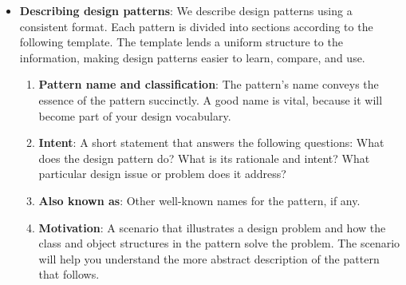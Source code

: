 \documentclass{report}
\begin{document}
\begin{itemize}
            \bigbreak \noindent 
            MVC also lets you change the way a view responds to user input without changing its visual presentation. You might want to change the way it responds to the keyboard, for example, or have it use a pop-up menu instead of command keys. MVC encapsulates the response mechanism in a Controller object. There is a class hierarchy of controllers, making it easy to create a new controller as a variation on an existing one.
            \bigbreak \noindent 
            A view uses an instance of a Controller subclass to implement a particular response strategy; to implement a different strategy, simply replace the instance with a different kind of controller. It's even possible to change a view's controller at run-time to let the view change the way it responds to user input. For example, a view can be disabled so that it doesn't accept input simply by giving it a controller that ignores input events.
            \bigbreak \noindent 
            The main relationships in MVC are given by the Observer, Composite, and Strategy design patterns. MVC uses other design patterns, such as Factory Method (121) to specify the default controller class for a view and Decorator (196) to add scrolling to a view.
        \item \textbf{Describing design patterns}: We describe design patterns using a consistent format. Each pattern is divided into sections according to the following template. The template lends a uniform structure to the information, making design patterns easier to learn, compare, and use.
            \begin{enumerate}
                \item \textbf{Pattern name and classification}: The pattern's name conveys the essence of the pattern succinctly. A good name is vital, because it will become part of your design vocabulary. 
                \item \textbf{Intent}: A short statement that answers the following questions: What does the design pattern do? What is its rationale and intent? What particular design issue or problem does it address? 
                \item \textbf{Also known as}: Other well-known names for the pattern, if any. 
                \item \textbf{Motivation}: A scenario that illustrates a design problem and how the class and object structures in the pattern solve the problem. The scenario will help you understand the more abstract description of the pattern that follows.

\end{enumerate}
\end{itemize}
\end{document}
